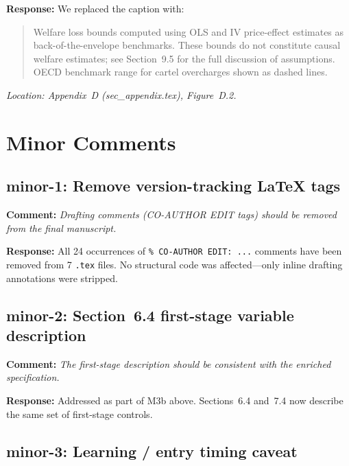 \documentclass[12pt]{article}
\newcommand{\referee}[1]{\medskip\noindent\textbf{Comment:} \textit{#1}\medskip}
\newcommand{\response}[1]{\noindent\textbf{Response:} #1}
\begin{document}
\response{We replaced the caption with:}

\begin{quote}
Welfare loss bounds computed using OLS and IV price-effect estimates as
back-of-the-envelope benchmarks. These bounds do not constitute causal
welfare estimates; see Section~9.5 for the full discussion of
assumptions. OECD benchmark range for cartel overcharges shown as dashed
lines.
\end{quote}

\noindent\textit{Location: Appendix~D (sec\_appendix.tex), Figure~D.2.}

\bigskip

\section*{Minor Comments}

\subsection*{minor-1: Remove version-tracking LaTeX tags}

\referee{Drafting comments (CO-AUTHOR EDIT tags) should be removed from
the final manuscript.}

\response{All 24 occurrences of \texttt{\% CO-AUTHOR EDIT: ...} comments
have been removed from 7 \texttt{.tex} files. No structural code was
affected---only inline drafting annotations were stripped.}

\subsection*{minor-2: Section~6.4 first-stage variable description}

\referee{The first-stage description should be consistent with the
enriched specification.}

\response{Addressed as part of M3b above. Sections~6.4 and~7.4 now
describe the same set of first-stage controls.}

\subsection*{minor-3: Learning / entry timing caveat}
\end{document}
